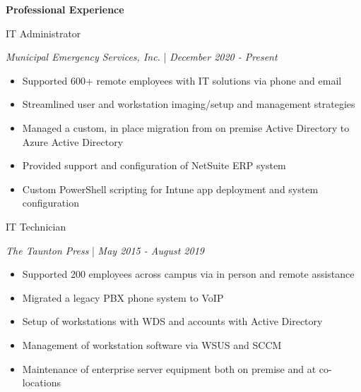 \documentclass[letterpaper]{article}
\begin{document}
    \begin{minipage}{0.7\textwidth}
        \begin{tcolorbox}[colback=sidebar!0, frame empty, sharp corners=all, left=1em]
            \begin{minipage}[t][0.973\textheight]{1.0\textwidth}
                \vspace{0.01\textheight}
                \textcolor{accent}{\textbf{{\Large Professional Experience}}}

                \vspace{0.02\textheight}
                {\large IT Administrator}

                \textit{Municipal Emergency Services, Inc.} | \textit{December 2020 - Present}
                \begin{flushleft}
                    \begin{itemize}[leftmargin=1em, label=\textcolor{accent}{\textbullet}]
                        \item Supported 600+ remote employees with IT solutions via phone and email
                        \item Streamlined user and workstation imaging/setup and management strategies
                        \item Managed a custom, in place migration from on premise Active Directory to Azure Active Directory
                        \item Provided support and configuration of NetSuite ERP system
                        \item Custom PowerShell scripting for Intune app deployment and system configuration
                    \end{itemize}
                \end{flushleft}

                \vspace{0.02\textheight}
                {\large IT Technician}

                \textit{The Taunton Press} | \textit{May 2015 - August 2019}
                \begin{flushleft}
                    \begin{itemize}[leftmargin=1em, label=\textcolor{accent}{\textbullet}]
                        \item Supported 200 employees across campus via in person and remote assistance
                        \item Migrated a legacy PBX phone system to VoIP
                        \item Setup of workstations with WDS and accounts with Active Directory
                        \item Management of workstation software via WSUS and SCCM
                        \item Maintenance of enterprise server equipment both on premise and at co-locations
                    \end{itemize}
                \end{flushleft}


\end{minipage}
\end{tcolorbox}
\end{minipage}
\end{document}
